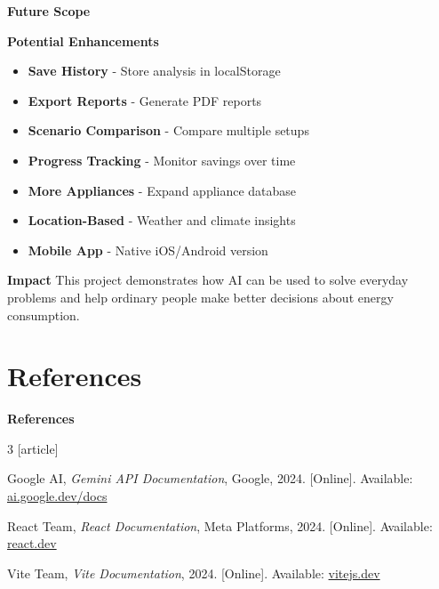 \documentclass[11pt,aspectratio=169,notes,mathserif]{beamer}
\begin{document}
\begin{frame}{\textbf{Future Scope}}
    \justifying
    
    \begin{block}{\textbf{Potential Enhancements}}
        \begin{itemize}
            \item \textbf{Save History} - Store analysis in localStorage
            \item \textbf{Export Reports} - Generate PDF reports
            \item \textbf{Scenario Comparison} - Compare multiple setups
            \item \textbf{Progress Tracking} - Monitor savings over time
            \item \textbf{More Appliances} - Expand appliance database
            \item \textbf{Location-Based} - Weather and climate insights
            \item \textbf{Mobile App} - Native iOS/Android version
        \end{itemize}
    \end{block}
    
    \begin{block}{\textbf{Impact}}
        This project demonstrates how AI can be used to solve everyday problems and help ordinary people make better decisions about energy consumption.
    \end{block}
\end{frame}

\section{References}
\begin{frame}{\textbf{References}}
    \begin{thebibliography}{3}
        [article]
        \justifying
        
        Google AI, \textit{Gemini API Documentation}, Google, 2024. 
        [Online]. Available: \href{https://ai.google.dev/docs}{ai.google.dev/docs}
        
        React Team, \textit{React Documentation}, Meta Platforms, 2024.
        [Online]. Available: \href{https://react.dev}{react.dev}
        
        Vite Team, \textit{Vite Documentation}, 2024.
        [Online]. Available: \href{https://vitejs.dev}{vitejs.dev}
        
    \end{thebibliography}
\end{frame}
\end{document}
